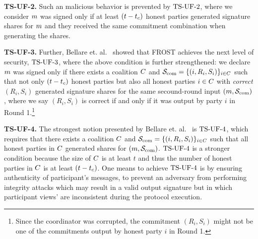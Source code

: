 
\medskip

\textbf{TS-UF-2.}
Such an malicious behavior is prevented by $\mathrm{TS}\mbox{-}\mathrm{UF}\mbox{-}{2}$, where
we consider $m$ was signed only if at least $(t - t_c)$ honest parties generated signature shares for $m$ and they received the same commitment combination when generating the shares.

\medskip

\textbf{TS-UF-3.} Further, Bellare et. al.~\cite{BellareCKMTZ22} showed that FROST achieves the next level of security, $\mathrm{TS}\mbox{-}\mathrm{UF}\mbox{-}{3}$, where the above condition is further strengthened:
we declare $m$ was signed only if there exists a coalition $C$ and $\mathcal{S}_{\rm com}=\{ (i, R_{i}, S_{i})\}_{i \in C}$ such that not only  $(t - t_c)$ honest parties but also all honest parties $i\in C$ with \emph{correct} $(R_{i}, S_{i})$ generated signature shares for the same secound-round input $(m, \mathcal{S}_{\rm com})$, where we say $(R_{i}, S_{i})$ is correct if and only if it was output by party $i$ in Round 1.\footnote{Since the coordinator was corrupted, the commitment $(R_{i}, S_{i})$ might not be one of the commitments output by honest party $i$ in Round 1.}


\medskip

\textbf{TS-UF-4.}
The strongest notion presented by Bellare et. al.~\cite{BellareCKMTZ22} is $\mathrm{TS}\mbox{-}\mathrm{UF}\mbox{-}{4}$, which requires that there exists a coalition $C$ and $\mathcal{S}_{\rm com}=\{ (i, R_{i}, S_{i})\}_{i \in C}$ such that all honest parties in $C$ generated shares for $(m, \mathcal{S}_{\rm com})$.
$\mathrm{TS}\mbox{-}\mathrm{UF}\mbox{-}{4}$ is a stronger condition because the size of $C$ is at least $t$ and thus the number of honest parties in $C$ is at least  $(t - t_c)$.
One means to achieve $\mathrm{TS}\mbox{-}\mathrm{UF}\mbox{-}{4}$ is by ensuring authenticity of participant's messages,
to prevent an adversary from performing integrity attacks which may result in a valid output signature but in which participant views' are inconsistent during the protocol execution.

